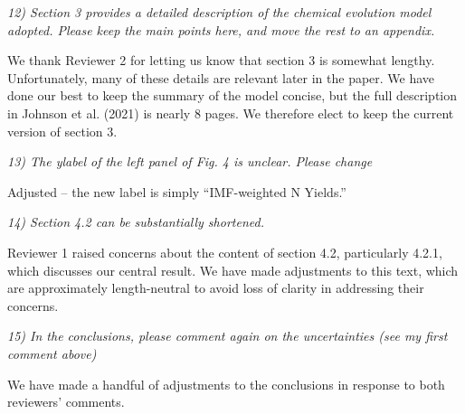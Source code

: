 \documentclass[12pt]{article}
\newcommand\doublebreak[0]{\par\null\par\noindent}
\begin{document}
\doublebreak
\textit{%
12) Section 3 provides a detailed description of the chemical evolution model
adopted.
Please keep the main points here, and move the rest to an appendix.
}
\doublebreak
We thank Reviewer 2 for letting us know that section 3 is somewhat lengthy.
Unfortunately, many of these details are relevant later in the paper.
We have done our best to keep the summary of the model concise, but the full
description in Johnson et al. (2021) is nearly 8 pages.
We therefore elect to keep the current version of section 3.
\doublebreak
\textit{%
13) The ylabel of the left panel of Fig. 4 is unclear. Please change
}
\doublebreak
Adjusted -- the new label is simply ``IMF-weighted N Yields.''
\doublebreak
\textit{%
14) Section 4.2 can be substantially shortened.
}
\doublebreak
Reviewer 1 raised concerns about the content of section 4.2, particularly
4.2.1, which discusses our central result.
We have made adjustments to this text, which are approximately length-neutral
to avoid loss of clarity in addressing their concerns.
\doublebreak
\textit{%
15) In the conclusions, please comment again on the uncertainties (see my first
comment above)
}
\doublebreak
We have made a handful of adjustments to the conclusions in response to both
reviewers' comments.
\end{document}
